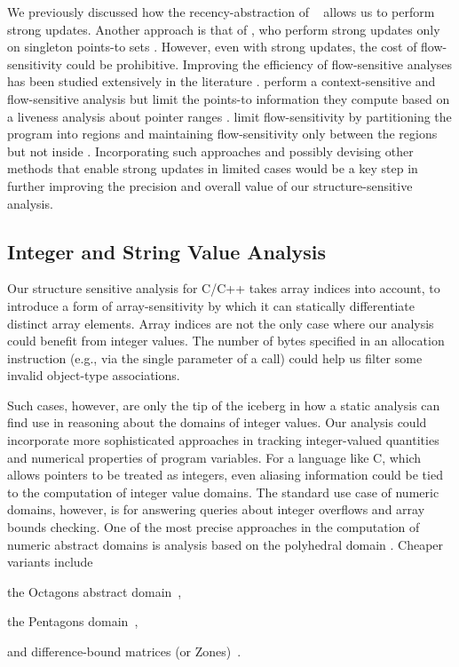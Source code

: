 We previously discussed how the recency-abstraction of
\citeauthor{sas/BalakrishnanR06}~\cite{sas/BalakrishnanR06} allows us
to perform strong updates.
%
Another approach is that of \citeauthor{popl/Lhotak11}, who perform
strong updates only on singleton points-to sets
\cite{popl/Lhotak11}.
%
However, even with strong updates, the cost of flow-sensitivity could
be prohibitive. Improving the efficiency of flow-sensitive analyses
has been studied extensively in the literature
\cite{sigsoft/LiCK11,sigsoft/SuiX16,ecoop/DeD12,iwmm/LiCK13}.
%
\citeauthor*{sas/KhedkerMR12} perform a context-sensitive and
flow-sensitive analysis but limit the points-to information they
compute based on a liveness analysis about pointer ranges
\cite{sas/KhedkerMR12}.
%
\citeauthor*{sas/YeSX14} limit flow-sensitivity by partitioning the
program into regions and maintaining flow-sensitivity only between the
regions but not inside \cite{sas/YeSX14}.
%
Incorporating such approaches and possibly devising other methods that
enable strong updates in limited cases would be a key step in
further improving the precision and overall value of our
structure-sensitive analysis.


\subsection{Integer and String Value Analysis}

Our structure sensitive analysis for C/C++ takes array indices into
account, to introduce a form of array-sensitivity by which it can
statically differentiate distinct array elements. Array indices are not
the only case where our analysis could benefit from integer values. The
number of bytes specified in an allocation instruction (e.g., via the
single parameter of a  call) could help us filter some
invalid object-type associations.

Such cases, however, are only the tip of the iceberg in how a static
analysis can find use in reasoning about the domains of integer
values. Our analysis could incorporate more sophisticated approaches
in tracking integer-valued quantities and numerical properties of
program variables. For a language like C, which allows pointers to be
treated as integers, even aliasing information could be tied to
the computation of integer value domains. The standard use case of
numeric domains, however, is for answering queries about integer overflows
and array bounds checking.
%
One of the most precise approaches in the computation of numeric
abstract domains is analysis based on the polyhedral domain
\cite{popl/CousotH78}. Cheaper variants include
\begin{inparablank}
\item the Octagons abstract domain~\cite{journals/lisp/Mine06},
\item the Pentagons domain~\cite{sac/LogozzoF08},
\item and difference-bound matrices (or Zones)~\cite{pado/Mine01}.
\end{inparablank}


